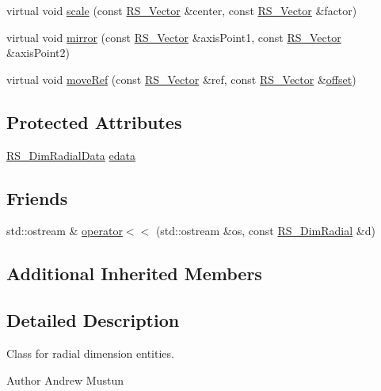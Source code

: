 \begin{DoxyCompactItemize}
\item 
virtual void \hyperlink{classRS__DimRadial_a034fa3b3a9beb23c13713089badab498}{scale} (const \hyperlink{classRS__Vector}{R\-S\-\_\-\-Vector} \&center, const \hyperlink{classRS__Vector}{R\-S\-\_\-\-Vector} \&factor)
\item 
virtual void \hyperlink{classRS__DimRadial_a7564b04a6c639242e27027022d3c6534}{mirror} (const \hyperlink{classRS__Vector}{R\-S\-\_\-\-Vector} \&axis\-Point1, const \hyperlink{classRS__Vector}{R\-S\-\_\-\-Vector} \&axis\-Point2)
\item 
virtual void \hyperlink{classRS__DimRadial_a67ece491d35a6d14be1b020a737f6ccc}{move\-Ref} (const \hyperlink{classRS__Vector}{R\-S\-\_\-\-Vector} \&ref, const \hyperlink{classRS__Vector}{R\-S\-\_\-\-Vector} \&\hyperlink{classRS__Entity_aa296d21b9aac99161d386ce2f60f0fea}{offset})
\end{DoxyCompactItemize}
\subsection*{Protected Attributes}
\begin{DoxyCompactItemize}
\item 
\hyperlink{classRS__DimRadialData}{R\-S\-\_\-\-Dim\-Radial\-Data} \hyperlink{classRS__DimRadial_a190f5bc537690214a82c9b443f416c0f}{edata}
\end{DoxyCompactItemize}
\subsection*{Friends}
\begin{DoxyCompactItemize}
\item 
std\-::ostream \& \hyperlink{classRS__DimRadial_a725c775ec3091123419fc206e120fcba}{operator$<$$<$} (std\-::ostream \&os, const \hyperlink{classRS__DimRadial}{R\-S\-\_\-\-Dim\-Radial} \&d)
\end{DoxyCompactItemize}
\subsection*{Additional Inherited Members}


\subsection{Detailed Description}
Class for radial dimension entities.

\begin{DoxyAuthor}{Author}
Andrew Mustun 
\end{DoxyAuthor}


